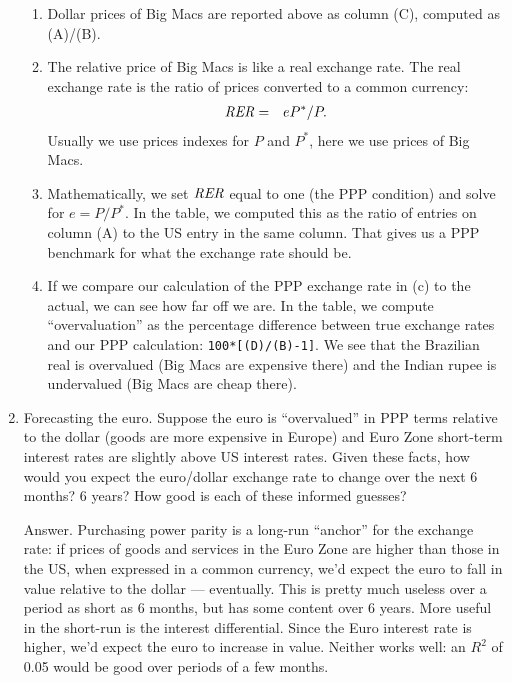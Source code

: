 \begin{enumerate}
\begin{enumerate}
\item Dollar prices of Big Macs are reported above as column (C),
computed as (A)/(B).

\item The relative price of Big Macs is like a real exchange rate.
The real exchange rate is the ratio of prices converted to a common currency:
\begin{eqnarray*}
    \mbox{\it RER\/}  &=&  eP^*/P .
\end{eqnarray*}
Usually we use prices indexes for $P$ and $P^*$, here we use prices of Big Macs.

\item Mathematically, we set $\mbox{\em RER\/}$ equal to one (the PPP condition)
and solve for $e = P/P^*$.
In the table, we computed this as the ratio of entries on column (A) to the US
entry in the same column.
That gives us a PPP benchmark for what the exchange rate should be.

\item If we compare our calculation of the PPP exchange rate in (c) to the actual,
we can see how far off we are.
In the table, we compute ``overvaluation'' as the percentage difference between
true exchange rates and our PPP calculation:  {\tt 100*[(D)/(B)-1]}.
We see that the Brazilian real is overvalued (Big Macs are expensive there)
and the Indian rupee is undervalued (Big Macs are cheap there).
\end{enumerate}

\item Forecasting the euro.
Suppose the euro is ``overvalued'' in PPP terms relative to the
dollar (goods are more expensive in Europe) and Euro Zone short-term interest rates
are slightly above US interest rates.
Given these facts, how would you expect the euro/dollar exchange rate to change over the next 6 months?  6 years?
How good is each of these informed guesses?

Answer.  Purchasing power parity is a long-run ``anchor'' for the
exchange rate:  if prices of goods and services in the Euro Zone
are higher than those in the US, when expressed in a common currency,
we'd expect the euro to fall in value relative to the dollar
--- eventually.
This is pretty much useless over a period as short as 6 months,
but has some content over 6 years.
More useful in the short-run is the interest differential.
Since the Euro interest rate is higher, we'd expect the euro to increase in value.
Neither works well:  an $R^2$ of 0.05 would be good over
periods of a few months.
\end{enumerate}


